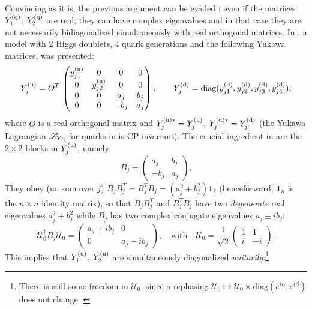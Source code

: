 \documentclass[12pt,a4paper]{article}
\begin{document}
Convincing as it is, the previous argument can be evaded \cite{Ecker:1987md,Gronau:1987xz}: even if the matrices $Y_{1}^{\rm (q)}$, $Y_{2}^{\rm (q)}$ are real, they can have complex eigenvalues and in that case they are not necessarily bidiagonalized simultaneously with real orthogonal matrices. In \cite{Ecker:1987md}, a model with 2 Higgs doublets, 4 quark generations and the following Yukawa matrices, was presented:
\begin{equation}\label{eq:4gen:ex:00}
  Y_{j}^{\rm (u)}=O^T\,\begin{pmatrix}y_{j1}^{\rm (u)}&0&0&0\\ 0&y_{j2}^{\rm (u)}&0&0\\ 0&0&a_j&b_j\\ 0&0&-b_j&a_j\end{pmatrix},\qquad Y_{j}^{\rm (d)}=\text{diag}(y_{j1}^{\rm (d)},y_{j2}^{\rm (d)},y_{j3}^{\rm (d)},y_{j4}^{\rm (d)}),
\end{equation}
where $O$ is a real orthogonal matrix and $Y_{j}^{\rm (u)\ast}=Y_{j}^{\rm (u)}$, $Y_{j}^{\rm (d)\ast}=Y_{j}^{\rm (d)}$ (the Yukawa Lagrangian $\mathscr L_{\rm Yq}$ for quarks in  is CP invariant). The crucial ingredient in  are the $2\times 2$ blocks in $Y_{j}^{\rm (u)}$, namely
\begin{equation}\label{eq:block2x2}
    B_j=\begin{pmatrix}a_j & b_j\\ -b_j & a_j \end{pmatrix}.
\end{equation}
They obey (no sum over $j$) $B_jB_j^T=B_j^TB_j=(a_j^2+b_j^2)\mathbf{1}_2$ (henceforward, $\mathbf{1}_n$ is the $n\times n$ identity matrix), so that $B_jB_j^T$ and $B_j^TB_j$ have two \emph{degenerate} real eigenvalues $a_j^2+b_j^2$ while $B_j$ has two complex conjugate eigenvalues $a_j\pm ib_j$:
\begin{equation}\label{eq:block2x2:diag:0}
 \mathcal U_{0}^\dagger B_j \mathcal U_{0}= \begin{pmatrix}a_j+ib_j&0\\ 0&a_j-ib_j\end{pmatrix},\quad \text{with}\quad \mathcal U_{0} =\frac{1}{\sqrt 2}\begin{pmatrix}1 & 1\\ i&-i\end{pmatrix}.
\end{equation}
This implies that $Y_{1}^{\rm (u)}$, $Y_{2}^{\rm (u)}$ are simultaneously diagonalized \emph{unitarily}:\footnote{There is still some freedom in $\mathcal U_0$, since a rephasing $\mathcal U_0\mapsto \mathcal U_0\times\text{diag}(e^{i\alpha},e^{i\beta})$ does not change .}
\end{document}
